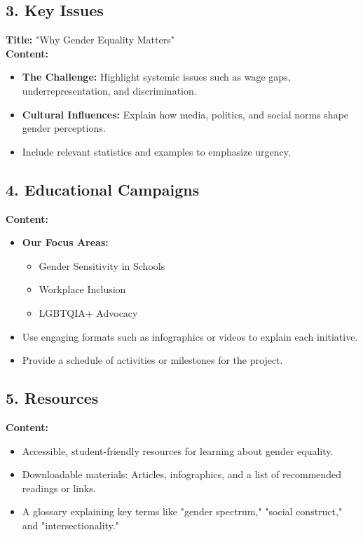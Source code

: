 \documentclass{article}
\begin{document}
\subsection*{3. Key Issues}
\textbf{Title:} "Why Gender Equality Matters" \\
\textbf{Content:}
\begin{itemize}
    \item \textbf{The Challenge:} Highlight systemic issues such as wage gaps, underrepresentation, and discrimination.
    \item \textbf{Cultural Influences:} Explain how media, politics, and social norms shape gender perceptions.
    \item Include relevant statistics and examples to emphasize urgency.
\end{itemize}

\subsection*{4. Educational Campaigns}
\textbf{Content:}
\begin{itemize}
    \item \textbf{Our Focus Areas:}
    \begin{itemize}
        \item Gender Sensitivity in Schools
        \item Workplace Inclusion
        \item LGBTQIA+ Advocacy
    \end{itemize}
    \item Use engaging formats such as infographics or videos to explain each initiative.
    \item Provide a schedule of activities or milestones for the project.
\end{itemize}

\subsection*{5. Resources}
\textbf{Content:}
\begin{itemize}
    \item Accessible, student-friendly resources for learning about gender equality.
    \item Downloadable materials: Articles, infographics, and a list of recommended readings or links.
    \item A glossary explaining key terms like "gender spectrum," "social construct," and "intersectionality."
\end{itemize}
\end{document}
